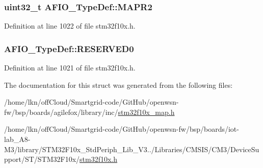 \subsubsection[{\texorpdfstring{M\+A\+P\+R2}{MAPR2}}]{ {\bf uint32\+\_\+t} A\+F\+I\+O\+\_\+\+Type\+Def\+::\+M\+A\+P\+R2}\hypertarget{struct_a_f_i_o___type_def_a4420b9fe25158ac2e5e32f6ad9d1b6ca}{}\label{struct_a_f_i_o___type_def_a4420b9fe25158ac2e5e32f6ad9d1b6ca}


Definition at line 1022 of file stm32f10x.\+h.

\subsubsection[{\texorpdfstring{R\+E\+S\+E\+R\+V\+E\+D0}{RESERVED0}}]{ A\+F\+I\+O\+\_\+\+Type\+Def\+::\+R\+E\+S\+E\+R\+V\+E\+D0}\hypertarget{struct_a_f_i_o___type_def_a6cf52816787797115664f0c8167a92b9}{}\label{struct_a_f_i_o___type_def_a6cf52816787797115664f0c8167a92b9}


Definition at line 1021 of file stm32f10x.\+h.



The documentation for this struct was generated from the following files\+:\begin{DoxyCompactItemize}
\item 
/home/lkn/off\+Cloud/\+Smartgrid-\/code/\+Git\+Hub/openwsn-\/fw/bsp/boards/agilefox/library/inc/\hyperlink{agilefox_2library_2inc_2stm32f10x__map_8h}{stm32f10x\+\_\+map.\+h}\item 
/home/lkn/off\+Cloud/\+Smartgrid-\/code/\+Git\+Hub/openwsn-\/fw/bsp/boards/iot-\/lab\+\_\+\+A8-\/\+M3/library/\+S\+T\+M32\+F10x\+\_\+\+Std\+Periph\+\_\+\+Lib\+\_\+\+V3../\+Libraries/\+C\+M\+S\+I\+S/\+C\+M3/\+Device\+Support/\+S\+T/\+S\+T\+M32\+F10x/\hyperlink{iot-lab___a8-_m3_2library_2_s_t_m32_f10x___std_periph___lib___v3_85_80_2_libraries_2_c_m_s_i_s_26497265545392eb5694b064ae15018db}{stm32f10x.\+h}\end{DoxyCompactItemize}
